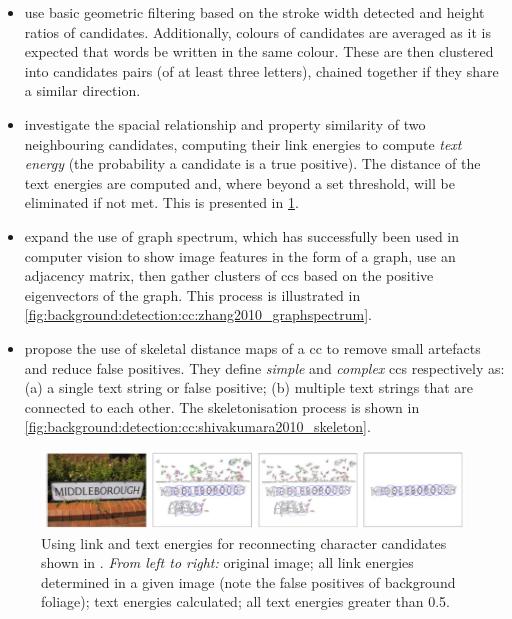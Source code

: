 \begin{itemize}
  \item \citet{Epshtein:2010tj} use basic geometric filtering based on the stroke width detected and height ratios of candidates. Additionally, colours of candidates are averaged as it is expected that words be written in the same colour. These are then clustered into candidates pairs (of at least three letters), chained together if they share a similar direction.
  \item \citet{Zhang:2011cl} investigate the spacial relationship and property similarity of two neighbouring candidates, computing their link energies to compute \textit{text energy} (the probability a candidate is a true positive). The distance of the text energies are computed and, where beyond a set threshold, will be eliminated if not met. This is presented in \cref{fig:background:detection:cc:zhang2011_textenergy}.
  \item \citet{Zhang:2010wa} expand the use of graph spectrum, which has successfully been used in computer vision \citep{Sarkar:1996ig} to show image features in the form of a graph, use an adjacency matrix, then gather clusters of \glspl{cc} based on the positive eigenvectors of the graph. This process is illustrated in \cref{fig:background:detection:cc:zhang2010_graphspectrum}.
  \item \citet{Shivakumara:2011dn} propose the use of skeletal distance maps of a \gls{cc} to remove small artefacts and reduce false positives. They define \textit{simple} and \textit{complex} \glspl{cc} respectively as: (a) a single text string or false positive; (b) multiple text strings that are connected to each other. The skeletonisation process is shown in \cref{fig:background:detection:cc:shivakumara2010_skeleton}.
\end{itemize}
 
\begin{figure}[p!]
  \centering
  \includegraphics[width=\textwidth]{images/background/zhang2011_textenergy}
  \caption[Text energy for connecting candidates back together]{Using link and text energies for reconnecting character candidates shown in \citet{Zhang:2011cl}. \textit{From left to right:} original image; all link energies determined in a given image (note the false positives of background foliage); text energies calculated; all text energies greater than 0.5.}
  \label{fig:background:detection:cc:zhang2011_textenergy}
\end{figure}

